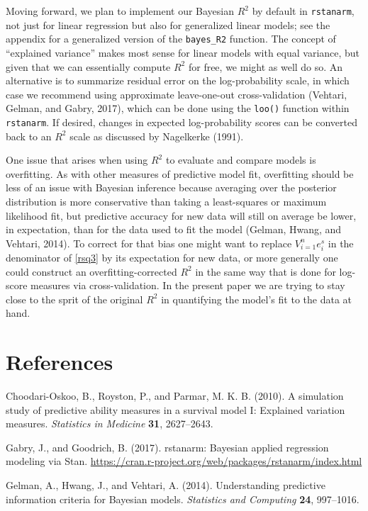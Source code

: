 \documentclass[11pt]{article}
\begin{document}
Moving forward, we plan to implement our Bayesian $R^2$ by default in
{\tt rstanarm}, not just for linear regression but also for generalized linear
models; see the appendix for a generalized version of the
\verb#bayes_R2# function. The concept of ``explained variance'' makes most
sense for linear models with equal variance, but given that we can essentially
compute $R^2$ for free, we might as well do so.  An alternative is to summarize
residual error on the log-probability scale, in which case we recommend using
approximate leave-one-out cross-validation (Vehtari, Gelman, and Gabry, 2017),
which can be done using the {\tt loo()} function within {\tt rstanarm}.   If
desired, changes in expected log-probability scores can be converted back to an
$R^2$ scale as discussed by Nagelkerke (1991).

One issue that arises when using $R^2$ to evaluate and compare models is
overfitting.  As with other measures of predictive model fit, overfitting should
be less of an issue with Bayesian inference because averaging over the posterior
distribution is more conservative than taking a least-squares or maximum
likelihood fit, but predictive accuracy for new data will still on average be
lower, in expectation, than for the data used to fit the model (Gelman, Hwang,
and Vehtari, 2014).  To correct for that bias one might want to replace
$V_{i=1}^n e_i^s$ in the denominator of \eqref{rsq3} by its expectation for new
data, or more generally one could construct an overfitting-corrected $R^2$ in
the same way that is done for log-score measures via cross-validation.  In the
present paper we are trying to stay close to the sprit of the original $R^2$ in
quantifying the model's fit to the data at hand.


\section*{References}

\noindent

\bibitem Choodari-Oskoo, B., Royston, P., and Parmar, M. K. B. (2010).  A simulation study of predictive ability measures in a survival model I: Explained variation measures.  {\em Statistics in Medicine} {\bf 31}, 2627--2643.

\bibitem Gabry, J., and Goodrich, B. (2017).  rstanarm:  Bayesian applied regression modeling via Stan.  \url{https://cran.r-project.org/web/packages/rstanarm/index.html}

\bibitem Gelman, A., Hwang, J., and Vehtari, A. (2014).  Understanding predictive information criteria for Bayesian models. {\em Statistics and Computing} {\bf 24}, 997--1016.
\end{document}
